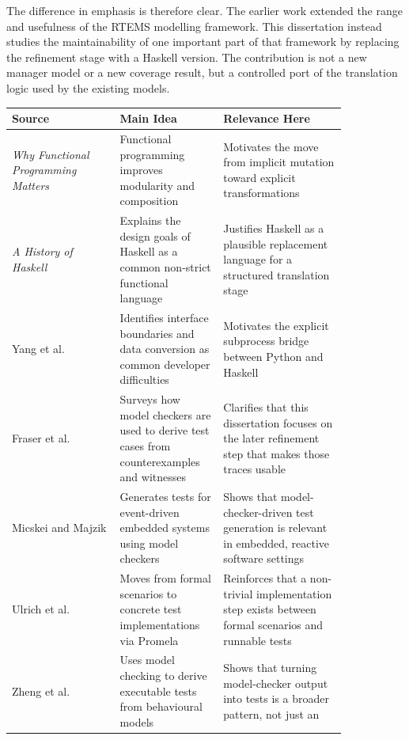 The difference in emphasis is therefore clear. The earlier work extended the range and usefulness of the RTEMS modelling framework. This dissertation instead studies the maintainability of one important part of that framework by replacing the refinement stage with a Haskell version. The contribution is not a new manager model or a new coverage result, but a controlled port of the translation logic used by the existing models.

\begin{table}[H]
\begin{center}
\begin{tabular}{|p{0.28\linewidth}|p{0.24\linewidth}|p{0.32\linewidth}|}
\hline
\textbf{Source} & \textbf{Main Idea} & \textbf{Relevance Here} \\
\hline
\emph{Why Functional Programming Matters} \citep{hughes1989why} &
Functional programming improves modularity and composition &
Motivates the move from implicit mutation toward explicit
transformations \\
\hline
\emph{A History of Haskell} \citep{hudak2007history} & Explains the
design goals of Haskell as a common non-strict functional language &
Justifies Haskell as a plausible replacement language for a structured
translation stage \\
\hline
Yang et al. \citep{yang2024multilanguage} & Identifies interface
boundaries and data conversion as common developer difficulties &
Motivates the explicit subprocess bridge between Python and Haskell \\
\hline
Fraser et al. \citep{fraser2009testing} & Surveys how model checkers
are used to derive test cases from counterexamples and witnesses &
Clarifies that this dissertation focuses on the later refinement step
that makes those traces usable \\
\hline
Micskei and Majzik \citep{micskei2006modelbased} & Generates tests for
event-driven embedded systems using model checkers & Shows that
model-checker-driven test generation is relevant in embedded,
reactive software settings \\
\hline
Ulrich et al. \citep{ulrich2010scenarios} & Moves from formal
scenarios to concrete test implementations via Promela & Reinforces
that a non-trivial implementation step exists between formal
scenarios and runnable tests \\
\hline
Zheng et al. \citep{zheng2007model} & Uses model checking to derive
executable tests from behavioural models & Shows that turning
model-checker output into tests is a broader pattern, not just an

\end{tabular}
\end{center}
\end{table}
